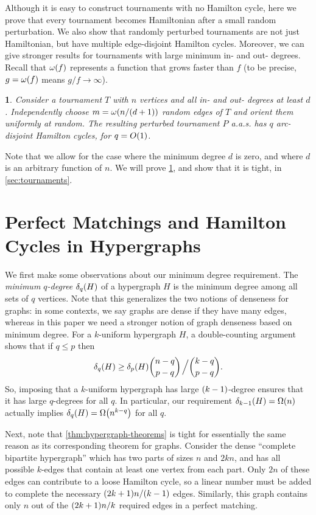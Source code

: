 \documentclass[11pt,english]{article}
\theoremstyle{plain}
\newtheorem{thm}{\protect\theoremname}
\theoremstyle{definition}
\theoremstyle{definition}
\theoremstyle{plain}
\theoremstyle{plain}
\theoremstyle{plain}
\theoremstyle{plain}
\theoremstyle{remark}
\theoremstyle{remark}
\let\originalleft\left
\let\originalright\right
\renewcommand{\left}{\mathopen{}\mathclose\bgroup\originalleft}
\renewcommand{\right}{\aftergroup\egroup\originalright}
\providecommand{\theoremname}{Theorem}
\begin{document}
Although it is easy to construct tournaments with no Hamilton cycle, here we prove 
that every tournament becomes Hamiltonian after a small random perturbation. We also
show that randomly perturbed tournaments are not just Hamiltonian,
but have multiple edge-disjoint Hamilton cycles.
Moreover, we can give stronger results
for tournaments with large minimum in- and out- degrees. 
Recall that $\omega\left(f\right)$ represents a function that grows faster than 
$f$ (to be precise, $g=\omega\left(f\right)$ means $g/f\to\infty$).
\begin{thm}
\label{thm:tournament}Consider a tournament $T$ with $n$ vertices
and all in- and out- degrees at least $d$. Independently choose
$m=\omega\left(n/\left(d+1\right)\right)$ random edges of $T$ and orient them uniformly at random.
The resulting perturbed tournament $P$ a.a.s.{} has $q$ arc-disjoint
Hamilton cycles, for $q=O\left(1\right)$.
\end{thm}

Note that we allow for the case where the minimum degree $d$ is zero, and where $d$ is an arbitrary function of $n$. We will prove \ref{thm:tournament}, and show that it is tight, in \ref{sec:tournaments}.


\section{\label{sec:hypergraphs}Perfect Matchings and Hamilton Cycles in
Hypergraphs}

We first make some observations about our minimum degree requirement.
The \emph{minimum $q$-degree} $\delta_{q}\left(H\right)$ of a hypergraph $H$
is the minimum degree among all sets of $q$ vertices. Note that this
generalizes the two notions of denseness for graphs: in some contexts,
we say graphs are dense if they have many edges,
whereas in this paper we need a stronger notion of graph denseness
based on minimum degree. For a $k$-uniform hypergraph
$H$, a double-counting argument shows that if $q\le p$ then
\[
\delta_{q}\left(H\right)\ge\delta_{p}\left(H\right){n-q \choose p-q}\left.\vphantom{\sum}\right/{k-q \choose p-q}.
\]
So, imposing that a $k$-uniform hypergraph has large $\left(k-1\right)$-degree
ensures that it has large $q$-degrees for all $q$. In particular,
our requirement $\delta_{k-1}\left(H\right)=\Omega\left(n\right)$
actually implies $\delta_{q}\left(H\right)=\Omega\left(n^{k-q}\right)$
for all $q$.

Next, note that \ref{thm:hypergraph-theorems} is tight for essentially
the same reason as its corresponding theorem for graphs. Consider the dense ``complete
bipartite hypergraph'' which has two parts of sizes $n$ and
$2kn$, and has all possible $k$-edges that contain at least one
vertex from each part. Only $2n$ of these edges can contribute
to a loose Hamilton cycle, so a linear number must be added to complete
the necessary $\left(2k+1\right)n/\left(k-1\right)$ edges. Similarly, this graph contains only $n$ out of the $\left(2k+1\right)n/k$ required edges in a perfect matching.
\end{document}
